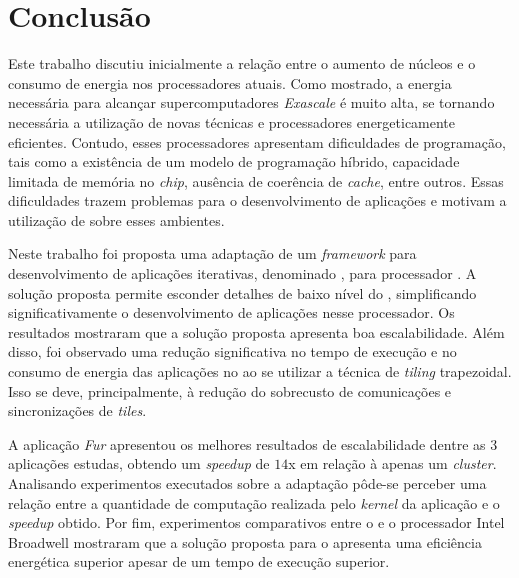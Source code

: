 \chapter{Conclusão}
\label{cha:conclusao}
Este trabalho discutiu inicialmente a relação entre o aumento de núcleos e o consumo de
energia nos processadores atuais. Como mostrado, a energia necessária para alcançar supercomputadores
\textit{Exascale} é muito alta, se tornando necessária a utilização de
novas técnicas e processadores energeticamente eficientes. Contudo, esses
processadores apresentam dificuldades de programação, tais como a existência de
um modelo de programação híbrido, capacidade limitada de memória no
\textit{chip}, ausência de coerência de \textit{cache}, entre outros. Essas
dificuldades trazem problemas para o desenvolvimento
de aplicações e motivam a utilização de \fws sobre esses ambientes.


Neste trabalho foi proposta uma adaptação de um \textit{framework} para
desenvolvimento de aplicações \stencil iterativas, denominado \pskel, para
processador \mppa. A solução proposta permite esconder detalhes de baixo nível
do \mppa, simplificando significativamente o desenvolvimento de aplicações
\stencil nesse processador. Os resultados mostraram que a solução proposta
apresenta boa escalabilidade. Além disso, foi observado uma redução
significativa no tempo de execução e no consumo de energia das aplicações no
\mppa ao se utilizar a técnica de \textit{tiling} trapezoidal. Isso se deve,
principalmente, à redução do sobrecusto de comunicações e sincronizações de
\textit{tiles}.

A aplicação \textit{Fur} apresentou os melhores resultados de escalabilidade
dentre as 3 aplicações estudas, obtendo um \textit{speedup} de $14$x em relação
à apenas um \textit{cluster}. Analisando experimentos executados sobre a
adaptação pôde-se perceber uma relação entre a quantidade de computação
realizada pelo \textit{kernel} da aplicação e o \textit{speedup} obtido. Por
fim, experimentos comparativos entre o \mppa e o processador Intel Broadwell
mostraram que a solução proposta para o \mppa apresenta uma eficiência
energética superior apesar de um tempo de execução superior.

